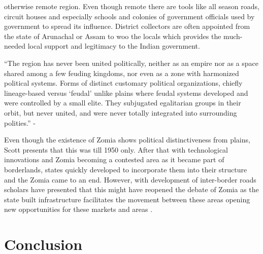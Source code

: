 \begin{sloppypar}
otherwise remote region. Even though remote there are tools like all season roads, circuit houses and especially schools and colonies of government officials used by government to spread its influence. District collectors are often appointed from the state of Arunachal or Assam to woo the locals which provides the much-needed local support and legitimacy to the Indian government.  

\vspace{0.3cm}

 \enquote{The region has never been united politically, neither as an empire nor as a space shared among a few feuding kingdoms, nor even as a zone with harmonized political systems. Forms of distinct customary political organizations, chiefly lineage-based versus \enquote{feudal} unlike plains where feudal systems developed and were controlled by a small elite. They subjugated egalitarian groups in their orbit, but never united, and were never totally integrated into surrounding polities.} - \citep{michaud2017s}

\vspace{0.3cm}

 Even though the existence of Zomia shows political distinctiveness from plains, Scott presents that this was till 1950 only. After that with technological innovations and Zomia becoming a contested area as it became part of borderlands, states quickly developed to incorporate them into their structure and the Zomia came to an end. However, with development of inter-border roads scholars have presented that this might have reopened the debate of Zomia as the state built infrastructure facilitates the movement between these areas opening new opportunities for these markets and areas \citep{murton2013himalayan}. 

 \section{Conclusion}


\end{sloppypar}
